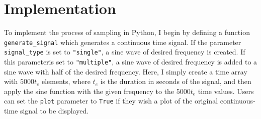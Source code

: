 \documentclass{article}
\begin{document}



\section{Implementation}


To implement the process of sampling in Python, I begin by defining a function \verb|generate_signal| which generates a continuous time signal.
If the parameter \verb|signal_type| is set to \verb|"single"|, a sine wave of desired frequency is created.
If this parameteris set to \verb|"multiple"|, a sine wave of desired frequency is added to a sine wave with half of the desired frequency. 
Here, I simply create a time array with $5000t_e$ elements, where $t_e$ is the duration in seconds of the signal, 
and then apply the sine function with the given frequency to the $5000 t_e$ time values. 
Users can set the \verb|plot| parameter to \verb|True| if they wish a plot of the original continuous-time signal to be displayed.
\end{document}
